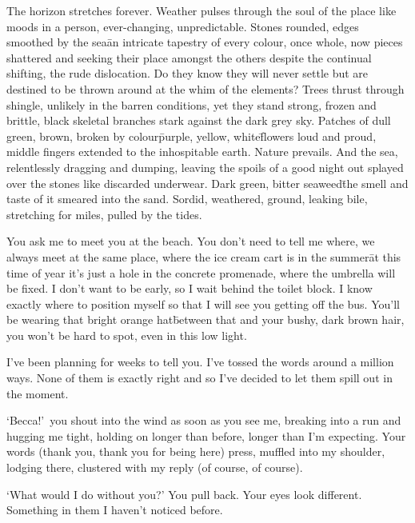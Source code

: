 

\prelude

The horizon stretches forever. Weather pulses through the soul of the
place like moods in a person, ever-changing, unpredictable. Stones
rounded, edges smoothed by the sea\=an intricate tapestry of every
colour, once whole, now pieces shattered and seeking their place
amongst the others despite the continual shifting, the rude
dislocation. Do they know they will never settle but are destined to
be thrown around at the whim of the elements? Trees thrust through
shingle, unlikely in the barren conditions, yet they stand strong,
frozen and brittle, black skeletal branches stark against the dark
grey sky. Patches of dull green, brown, broken by colour\=purple,
yellow, white\=flowers loud and proud, middle fingers extended to the
inhospitable earth. Nature prevails. And the sea, relentlessly
dragging and dumping, leaving the spoils of a good night out splayed
over the stones like discarded underwear. Dark green, bitter
seaweed\=the smell and taste of it smeared into the sand. Sordid,
weathered, ground, leaking bile, stretching for miles, pulled by the
tides.

\fugue

You ask me to meet you at the beach. You don't need to tell me where,
we always meet at the same place, where the ice cream cart is in the
summer\=at this time of year it's just a hole in the concrete
promenade, where the umbrella will be fixed. I don't want to be early,
so I wait behind the toilet block. I know exactly where to position
myself so that I will see you getting off the bus. You'll be wearing
that bright orange hat\=between that and your bushy, dark brown hair,
you won't be hard to spot, even in this low light.

I've been planning for weeks to tell you. I've tossed the words around
a million ways.  None of them is exactly right and so I've decided to
let them spill out in the moment.

`Becca!'~you shout into the wind as soon as you see me, breaking
into a run and hugging me tight, holding on longer than before, longer
than I'm expecting. Your words (thank you, thank you for being here)
press, muffled into my shoulder, lodging there, clustered with my
reply (of course, of course).

`What would I do without you?' You pull back. Your eyes look
different. Something in them I haven't noticed before.

